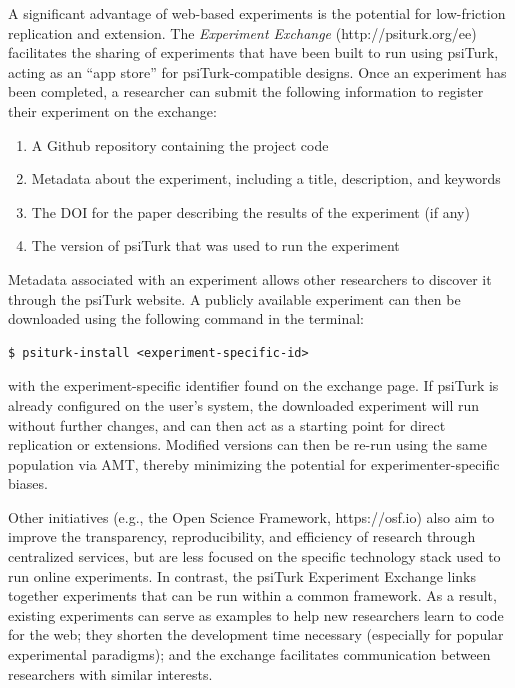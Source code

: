 \documentclass[twocolumn]{svjour3}          %
\newcommand{\psiturk}[0]{\textsf{psiTurk}}
\begin{document}
A significant advantage of web-based experiments is the potential for low-friction replication and extension. 
The \emph{Experiment Exchange} (\textsf{http://psiturk.org/ee}) facilitates the sharing of experiments that have been built to run using \psiturk{}, acting as an ``app store'' for \psiturk{}-compatible designs.
Once an experiment has been completed, a researcher can submit the following information to register their experiment on the exchange:

\begin{enumerate}
\item A Github repository containing the project code
\item Metadata about the experiment, including a title, description, and keywords
\item The DOI for the paper describing the results of the experiment (if any)
\item The version of \psiturk{} that was used to run the experiment
\end{enumerate}


Metadata associated with an experiment allows other researchers to discover it through the \psiturk{} website.
A publicly available experiment can then be downloaded using the following command in the terminal:

\begin{lstlisting}
$ psiturk-install <experiment-specific-id>
\end{lstlisting}

\noindent with the experiment-specific identifier found on the exchange page.
If \psiturk{} is already configured on the user's system, the downloaded experiment will run without further changes, and can then act as a starting point for direct replication or extensions.
Modified versions can then be re-run using the same population via AMT, thereby minimizing the potential for experimenter-specific biases.

Other initiatives (e.g., the Open Science Framework, \textsf{https://osf.io}) also aim to improve the transparency, reproducibility, and efficiency of research through centralized services, but are less focused on the specific technology stack used to run online experiments.
In contrast, the \psiturk{} Experiment Exchange links together experiments that can be run within a common framework.
As a result, existing experiments can serve as examples to help new researchers learn to code for the web; they shorten the development time necessary (especially for popular experimental paradigms); and the exchange facilitates communication between researchers with similar interests.
\end{document}
